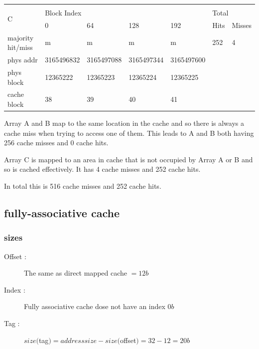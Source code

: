 \documentclass[12pt]{article}
\begin{document}
\begin{table}[H]
\begin{tabular}{lllllll}
                                         &            &            &            &                                 &            &              \\
\multicolumn{1}{l|}{\multirow{2}{*}{C}}  & \multicolumn{4}{l|}{Block Index}                                       & \multicolumn{2}{l}{Total} \\
\multicolumn{1}{l|}{}                    & 0          & 64         & 128        & \multicolumn{1}{l|}{192}        & Hits       & Misses       \\ \hline
\multicolumn{1}{l|}{majority hit/miss}   & m          & m          & m          & \multicolumn{1}{l|}{m}          & 252        & 4            \\
\multicolumn{1}{l|}{phys addr}           & 3165496832 & 3165497088 & 3165497344 & \multicolumn{1}{l|}{3165497600} &            &              \\
\multicolumn{1}{l|}{phys block}          & 12365222   & 12365223   & 12365224   & \multicolumn{1}{l|}{12365225}   &            &              \\
\multicolumn{1}{l|}{cache block}         & 38         & 39         & 40         & \multicolumn{1}{l|}{41}         &            &             
\end{tabular}
\end{table}
			
				Array A and B map to the same location in the cache and so there is always a cache miss when trying to access one of them. This leads to A and B both having 256 cache misses and 0 cache hits. 

				Array C is mapped to an area in cache that is not occupied by Array A or B and so is cached effectively. It has 4 cache misses and 252 cache hits.

				In total this is 516 cache misses and 252 cache hits.
		\subsection{ fully-associative cache}

			\subsubsection{sizes}
				\begin{description}
					\item[Offset : ] The same as direct mapped cache $ = 12 b$
					\item[Index : ] Fully associative cache dose not have an index $0b$
					\item[Tag : ] $size($tag$) = addresssize- size($offset$) = 32 - 12 = 20b$
				\end{description}
\end{document}
